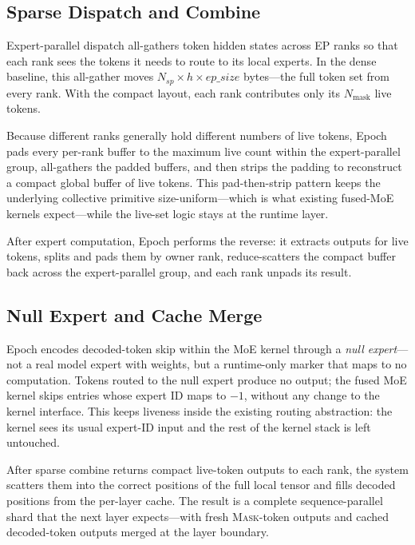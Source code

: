 \documentclass[sigconf,review,anonymous, 10pt]{acmart}
\newcommand{\sys}{Epoch}
\newcommand{\mask}{\textsc{Mask}}
\begin{document}
\subsection{Sparse Dispatch and Combine}

Expert-parallel dispatch all-gathers token hidden states across EP ranks so that each rank sees the tokens it needs to route to its local experts.
In the dense baseline, this all-gather moves $N_{sp} \times h \times \mathit{ep\_size}$ bytes---the full token set from every rank.
With the compact layout, each rank contributes only its $N_{\text{mask}}$ live tokens.

Because different ranks generally hold different numbers of live tokens, \sys{} pads every per-rank buffer to the maximum live count within the expert-parallel group, all-gathers the padded buffers, and then strips the padding to reconstruct a compact global buffer of live tokens.
This pad-then-strip pattern keeps the underlying collective primitive size-uniform---which is what existing fused-MoE kernels expect---while the live-set logic stays at the runtime layer.

After expert computation, \sys{} performs the reverse: it extracts outputs for live tokens, splits and pads them by owner rank, reduce-scatters the compact buffer back across the expert-parallel group, and each rank unpads its result.

\subsection{Null Expert and Cache Merge}

\sys{} encodes decoded-token skip within the MoE kernel through a \emph{null expert}---not a real model expert with weights, but a runtime-only marker that maps to no computation.
Tokens routed to the null expert produce no output; the fused MoE kernel skips entries whose expert ID maps to $-1$, without any change to the kernel interface.
This keeps liveness inside the existing routing abstraction: the kernel sees its usual expert-ID input and the rest of the kernel stack is left untouched.

After sparse combine returns compact live-token outputs to each rank, the system scatters them into the correct positions of the full local tensor and fills decoded positions from the per-layer cache.
The result is a complete sequence-parallel shard that the next layer expects---with fresh \mask{}-token outputs and cached decoded-token outputs merged at the layer boundary.
\end{document}
